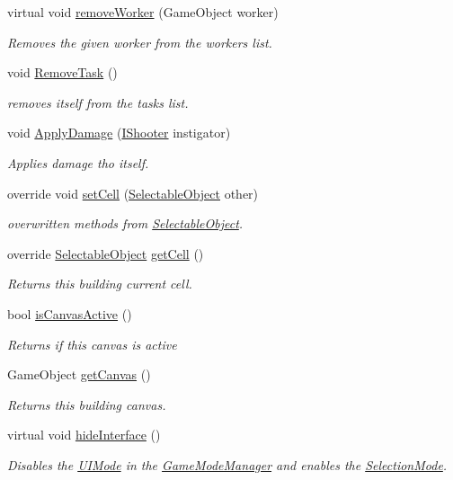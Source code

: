 \begin{DoxyCompactItemize}
virtual void \mbox{\hyperlink{class_building_aad4618cbe489fbfc99282ff8ec77297b}{remove\+Worker}} (Game\+Object worker)
\begin{DoxyCompactList}\small\item\em Removes the given worker from the workers list. \end{DoxyCompactList}\item 
void \mbox{\hyperlink{class_building_addab7076893886e5bf445ee317a81fb1}{Remove\+Task}} ()
\begin{DoxyCompactList}\small\item\em removes itself from the tasks list. \end{DoxyCompactList}\item 
void \mbox{\hyperlink{class_building_a1486c409143123873c387c5bd7918b76}{Apply\+Damage}} (\mbox{\hyperlink{interface_i_shooter}{I\+Shooter}} instigator)
\begin{DoxyCompactList}\small\item\em Applies damage tho itself. \end{DoxyCompactList}\item 
override void \mbox{\hyperlink{class_building_a81f0e7df4171d3508afefe8deac1eea6}{set\+Cell}} (\mbox{\hyperlink{class_selectable_object}{Selectable\+Object}} other)
\begin{DoxyCompactList}\small\item\em overwritten methods from \mbox{\hyperlink{class_selectable_object}{Selectable\+Object}}. \end{DoxyCompactList}\item 
override \mbox{\hyperlink{class_selectable_object}{Selectable\+Object}} \mbox{\hyperlink{class_building_a3e889268dc78194d5a3ae48f73067ff8}{get\+Cell}} ()
\begin{DoxyCompactList}\small\item\em Returns this building current cell. \end{DoxyCompactList}\item 
bool \mbox{\hyperlink{class_building_aba7c58665a626c146f2fc1e8b35cebb7}{is\+Canvas\+Active}} ()
\begin{DoxyCompactList}\small\item\em Returns if this canvas is active \end{DoxyCompactList}\item 
Game\+Object \mbox{\hyperlink{class_building_ac9c5243414b3e56c11b3af749c5dd61d}{get\+Canvas}} ()
\begin{DoxyCompactList}\small\item\em Returns this building canvas. \end{DoxyCompactList}\item 
virtual void \mbox{\hyperlink{class_building_a29767cd7ca42694862d08cb4bd71154a}{hide\+Interface}} ()
\begin{DoxyCompactList}\small\item\em Disables the \mbox{\hyperlink{class_u_i_mode}{U\+I\+Mode}} in the \mbox{\hyperlink{class_game_mode_manager}{Game\+Mode\+Manager}} and enables the \mbox{\hyperlink{class_selection_mode}{Selection\+Mode}}. \end{DoxyCompactList}\end{DoxyCompactItemize}
